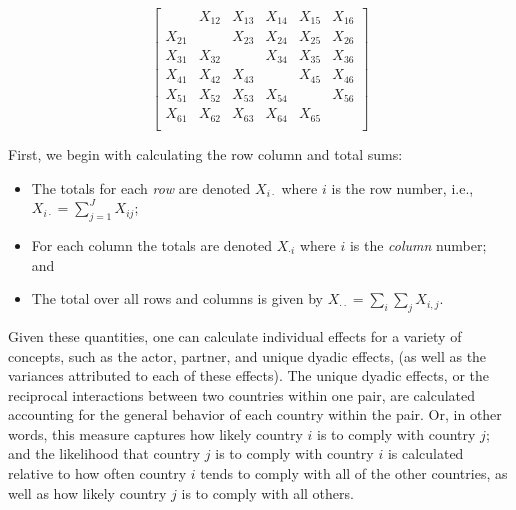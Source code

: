 \singlespacing
\[
\left[
\begin{array}{cccccc}
 & X_{12}  & X_{13}  & X_{14} & X_{15} & X_{16} \\
X_{21}  &  & X_{23}  & X_{24} & X_{25} & X_{26} \\
X_{31}  & X_{32}  &    & X_{34} & X_{35} & X_{36} \\
X_{41}  & X_{42}  & X_{43}  &  & X_{45} & X_{46} \\
X_{51}  & X_{52}  & X_{53}  & X_{54} &   & X_{56} \\
X_{61}  & X_{62}  & X_{63}  & X_{64} & X_{65} &   \\
\end{array}
\right]
\]

\doublespacing
First, we begin with calculating the row column and total sums:

\begin{itemize}
	\item The totals for each \emph{ row} are denoted $X_{i \cdot}$ where $i$ is the row number, i.e.,
	~\\
	$X_{i \cdot} = \sum_{j=1}^{J} X_{ij}$;
	\item For each column the totals are denoted
	 $X_{\cdot i}$ where $i$ is the \emph{column} number; and 
	 \item The total over all rows and columns is given by $X_{\cdot \cdot} = \sum_i \sum_j X_{i,j}$.
 \end{itemize}
 
Given these quantities, one can calculate individual effects for a variety of concepts, such as the actor, partner, and unique dyadic effects, (as well as the variances attributed to each of these effects). The unique dyadic effects, or the reciprocal interactions between two countries within one pair, are calculated accounting for the general behavior of each country within the pair. Or, in other words, this measure captures how likely country $i$ is to comply with country $j$; and the likelihood that country $j$ is to comply with country $i$ is calculated relative to how often country $i$ tends to comply with all of the other countries, as well as how likely country $j$ is to comply with all others. 

